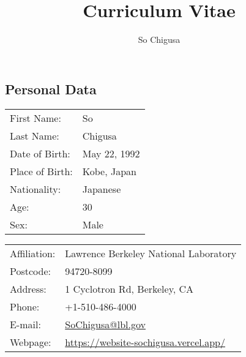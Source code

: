 \documentclass[12pt]{article}
\title{\vspace{-2cm}\textbf{Curriculum Vitae}}
\author{So Chigusa}
\begin{document}
\large
\maketitle

\newcommand{\lsim}{\stackrel{<}{_\sim}}
\newcommand{\gsim}{\stackrel{>}{_\sim}}

\newcommand{\rem}[1]{{$\spadesuit$\bf #1$\spadesuit$}}


\renewcommand{\thefootnote}{\arabic{footnote})}
\setcounter{footnote}{0}

\vspace{-5mm}
\subsection*{Personal Data}

\vspace{-3mm}

\begin{table}[h]
 \begin{tabular}{ll}
  First Name: & So %
      \\
  Last Name: & Chigusa %
      \\
  Date of Birth: & May 22, 1992 \\
  Place of Birth: & Kobe, Japan \\
  Nationality: & Japanese \\
  Age: & 30 \\
  Sex: & Male \\
 \end{tabular}
\end{table}

\vspace{-5mm}
\begin{table}[h]
 \begin{tabular}{ll}
  Affiliation: & Lawrence Berkeley National Laboratory \\
  Postcode: & 94720-8099 \\
  Address: & 1 Cyclotron Rd, Berkeley, CA \\
  Phone: & +1-510-486-4000 \\
  E-mail: &
      \href{mailto:SoChigusa@lbl.gov}{SoChigusa@lbl.gov}
      \\
  Webpage: & \url{https://website-sochigusa.vercel.app/} \\
 \end{tabular}
\end{table}
\vspace{-5mm}
\end{document}
